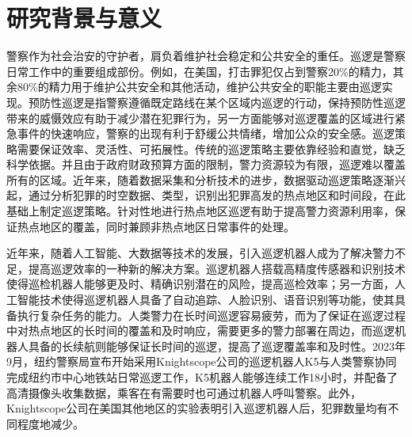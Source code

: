 \documentclass[finalformat,mathCMR]{HUSTthesis}
\begin{document}
\graphicspath{{figures/}}


\frontmatter

\makecover
\makeattention

\tableofcontents

% 

\mainmatter

\raggedbottom

%
%

\chapter{研究背景与意义}
警察作为社会治安的守护者，肩负着维护社会稳定和公共安全的重任。巡逻是警察日常工作中的重要组成部份。例如，在美国，打击罪犯仅占到警察20\%的精力，其余80\%的精力用于维护公共安全和其他活动\cite{wuschkeWhatPoliceWhere2018}，维护公共安全的职能主要由巡逻实现。预防性巡逻是指警察遵循既定路线在某个区域内巡逻的行动，保持预防性巡逻带来的威慑效应有助于减少潜在犯罪行为，另一方面能够对巡逻覆盖的区域进行紧急事件的快速响应，警察的出现有利于舒缓公共情绪，增加公众的安全感\citep{muaafa2016engineering}。巡逻策略需要保证效率、灵活性、可拓展性\citep{chenDevelopingOnlineCooperative2017}。传统的巡逻策略主要依靠经验和直觉，缺乏科学依据。并且由于政府财政预算方面的限制，警力资源较为有限，巡逻难以覆盖所有的区域。近年来，随着数据采集和分析技术的进步，数据驱动巡逻策略逐渐兴起，通过分析犯罪的时空数据、类型，识别出犯罪高发的热点地区和时间段\citep{bragaHotSpotsPolicing2019a, chaineyImprovingCreationHot2021, hajelaClusteringBasedHotspot2020, tom-jackRoleGeoprocessingMapping2019}，在此基础上制定巡逻策略。针对性地进行热点地区巡逻有助于提高警力资源利用率，保证热点地区的覆盖，同时兼顾非热点地区日常事件的处理。

近年来，随着人工智能、大数据等技术的发展，引入巡逻机器人成为了解决警力不足，提高巡逻效率的一种新的解决方案。巡逻机器人搭载高精度传感器和识别技术使得巡检机器人能够更及时、精确识别潜在的风险，提高巡检效率；另一方面，人工智能技术使得巡逻机器人具备了自动追踪、人脸识别、语音识别等功能，使其具备执行复杂任务的能力。人类警力在长时间巡逻容易疲劳，而为了保证在巡逻过程中对热点地区的长时间的覆盖和及时响应，需要更多的警力部署在周边，而巡逻机器人具备的长续航则能够保证长时间的巡逻，提高了巡逻覆盖率和及时性。2023年9月，纽约警察局宣布开始采用Knightscope公司的巡逻机器人K5与人类警察协同完成纽约市中心地铁站日常巡逻工作\citep{mays400poundRobotGets2023}，K5机器人能够连续工作18小时，并配备了高清摄像头收集数据，乘客在有需要时也可通过机器人呼叫警察。此外，Knightscope公司在美国其他地区的实验表明引入巡逻机器人后，犯罪数量均有不同程度地减少。
\end{document}
